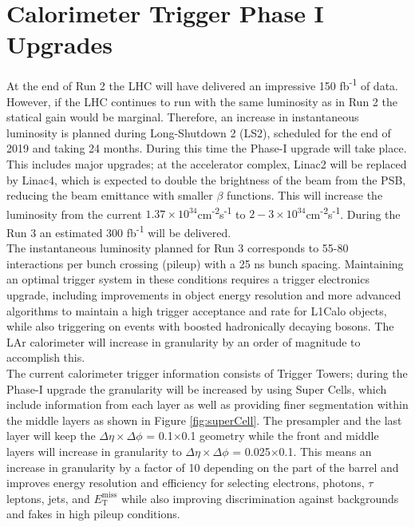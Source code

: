 \section{Calorimeter Trigger Phase I Upgrades}
At the end of Run 2 the LHC will have delivered an impressive 150 fb\textsuperscript{-1} of data.  However, if the LHC continues to run with the same luminosity as in Run 2 the statical gain would be marginal.  Therefore, an increase in instantaneous luminosity is planned during Long-Shutdown 2 (LS2), scheduled for the end of 2019 and taking 24 months.  During this time the Phase-I upgrade will take place.  This includes major upgrades; at the accelerator complex, Linac2 will be replaced by Linac4, which is expected to double the brightness of the beam from the PSB, reducing the beam emittance with smaller $\beta$ functions.  This will increase the luminosity from the current $1.37\times10^{34}$cm\textsuperscript{-2}s\textsuperscript{-1} to $2-3\times10^{34}$cm\textsuperscript{-2}s\textsuperscript{-1}.  During the Run 3 an estimated 300 fb\textsuperscript{-1} will be delivered. \\ %

The instantaneous luminosity planned for Run 3 corresponds to 55-80 interactions per bunch crossing (pileup) with a 25 ns bunch spacing.  Maintaining an optimal trigger system in these conditions requires a trigger electronics upgrade, including improvements in object energy resolution and more advanced algorithms to maintain a high trigger acceptance and rate for L1Calo objects, while also triggering on events with boosted hadronically decaying bosons.  The LAr calorimeter will increase in granularity by an order of magnitude to accomplish this. \\

The current calorimeter trigger information consists of Trigger Towers; during the Phase-I upgrade the granularity will be increased by using Super Cells, which include information from each layer as well as providing finer segmentation within the middle layers as shown in Figure \ref{fig:superCell}.  The presampler and the last layer will keep the $\Delta\eta \times \Delta\phi$ = 0.1$\times$0.1 geometry while the front and middle layers will increase in granularity to $\Delta\eta \times \Delta\phi$ = 0.025$\times$0.1.  This means an increase in granularity by a factor of 10 depending on the part of the barrel and improves energy resolution and efficiency for selecting electrons, photons, $\tau$ leptons, jets, and $E_{\mathrm{T}}^{\mathrm{miss}}$ while also improving discrimination against backgrounds and fakes in high pileup conditions.  \\

